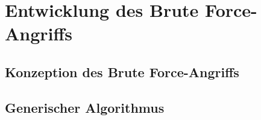 \chapter{Entwicklung des Brute Force-Angriffs}
\label{ideeBruteForce}

\section{Konzeption des Brute Force-Angriffs}

\section{Generischer Algorithmus}
